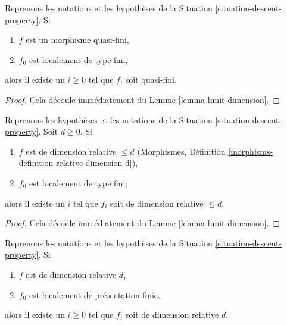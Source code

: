 \begin{lemma}
\label{lemma-descend-quasi-finite}
Reprenons les notations et les hypothèses de la Situation \ref{situation-descent-property}.
Si
\begin{enumerate}
\item $f$ est un morphisme quasi-fini,
\item $f_0$ est localement de type fini,
\end{enumerate}
alors il existe un $i \geq 0$ tel que $f_i$ soit quasi-fini.
\end{lemma}

\begin{proof}
Cela découle immédiatement du Lemme \ref{lemma-limit-dimension}.
\end{proof}

\begin{lemma}
\label{lemma-eventually-relative-dimension}
Reprenons les hypothèses et les notations de la Situation \ref{situation-descent-property}.
Soit $d \geq 0$. Si
\begin{enumerate}
\item $f$ est de dimension relative $\leq d$
(Morphismes, Définition \ref{morphisms-definition-relative-dimension-d}),
\item $f_0$ est localement de type fini,
\end{enumerate}
alors il existe un $i$ tel que $f_i$ soit de dimension relative $\leq d$.
\end{lemma}

\begin{proof}
Cela découle immédiatement du Lemme \ref{lemma-limit-dimension}.
\end{proof}

\begin{lemma}
\label{lemma-descend-dimension-d}
Reprenons les notations et les hypothèses de la Situation \ref{situation-descent-property}.
Si
\begin{enumerate}
\item $f$ est de dimension relative $d$,
\item $f_0$ est localement de présentation finie,
\end{enumerate}
alors il existe un $i \geq 0$ tel que $f_i$
soit de dimension relative $d$.
\end{lemma}

